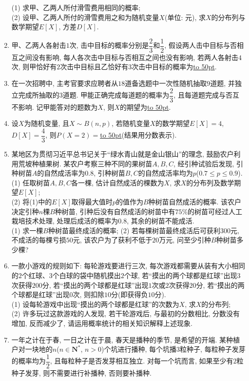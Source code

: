 \documentclass[10pt,a4paper]{article}
\newcommand{\blank}[1]{\underline{\hbox to #1pt{}}}
\begin{document}
\begin{enumerate}[1.]
(1) 求甲、乙两人所付滑雪费用相同的概率;\\
(2) 设甲、乙两人所付的滑雪费用之和为随机变量$X$(单位: 元), 求$X$的分布列与数学期望$E[X]$, 方差$D[X]$.
\item 甲、乙两人各射击$1$次, 击中目标的概率分别是$\dfrac 23$和$\dfrac 12$, 假设两人击中目标与否相互之间没有影响, 每人各次击中目标与否相互之间也没有影响, 若两人各射击$4$次, 则甲恰好有$2$次击中目标且乙恰好有$3$次击中目标的概率为\blank{50}.
\item 在一次招聘中, 主考官要求应聘者从$18$道备选题中一次性随机抽取$9$道题, 并独立完成所抽取的$3$道题. 甲能正确完成每道题的概率为$\dfrac 23$, 且每道题完成与否互不影响. 记甲能答对的题数为$X$, 则$X$的期望为\blank{50}.
\item 设$X$为随机变量, 且$X\sim B(n,p)$, 若随机变量$X$的数学期望$E[X]=4$, $D[X]=\dfrac 43$, 则$P(X=2)=$\blank{50}(结果用分数表示).
\item 某地区为贯彻习近平总书记关于``绿水青山就是金山银山''的理念, 鼓励农户利用荒坡种植果树. 某农户考察三种不同的果树苗$A,B,C$, 经引种试验后发现, 引种树苗$A$的自然成活率为$0.8$, 引种树苗$B,C$的自然成活率均为$p$($0.7\le p\le 0.9$).\\
(1) 任取树苗$A,B,C$各一棵, 估计自然成活的棵数为$X$, 求$X$的分布列及数学期望$E[X]$;\\
(2) 将(1)中的$E[X]$取得最大值时$p$的值作为$B$种树苗自然成活的概率. 该农户决定引种$n$棵$B$种树苗, 引种后没有自然成活的树苗中有$75\%$的树苗可经过人工栽培技术处理, 处理后成活的概率为$0.8$, 其余的树苗不能成活.\\
(1) 求一棵$B$种树苗最终成活的概率;
(2) 若每棵树苗最终成活后可获利$300$元, 不成活的每棵亏损$50$元, 该农户为了获利不低于$20$万元, 问至少引种$B$种树苗多少棵?
\item 一款小游戏的规则如下: 每轮游戏要进行三次, 每次游戏都需要从装有大小相同的$2$个红球、$3$个白球的袋中随机摸出$2$个球, 若``摸出的两个球都是红球''出现$3$次获得$200$分, 若``摸出的两个球都是红球''出现$1$次或$2$次获得$20$分, 若``摸出的两个球都是红球''出现$0$次, 则扣除$10$分(即获得负$10$分).\\
(1) 设每轮游戏中出现``摸出的两个球都是红球''的次数为$X$, 求$X$的分布列;\\
(2) 许多玩过这款游戏的人发现, 若干轮游戏后, 与最初的分数相比, 分数没有增加, 反而减少了, 请运用概率统计的相关知识解释上述现象.
\item 一年之计在于春, 一日之计在于晨, 春天是播种的季节, 是希望的开端. 某种植户对一块地的$n$($n\in \mathbf{N}^*$, $n>0$)个坑进行播种, 每个坑播$3$粒种子, 每粒种子发芽的概率均为$\dfrac 12$, 且每粒种子是否发芽相互独立. 对每一个坑而言, 如果至少有$2$粒种子发芽, 则不需要进行补播种, 否则要补播种.\\

\end{enumerate}
\end{document}
